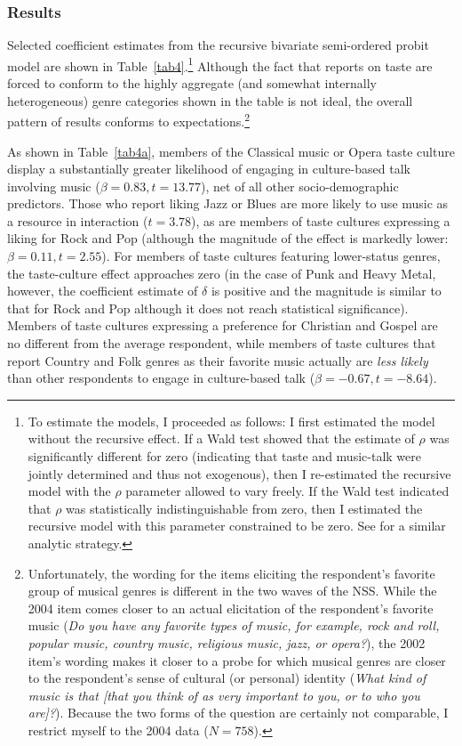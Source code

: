 \documentclass[11pt]{article}
\begin{document}
\subsubsection{Results}
Selected coefficient estimates from the recursive bivariate semi-ordered probit model are shown in Table~\ref{tab4}.\footnote{To estimate the models, I proceeded as follows:  I first estimated the model without the recursive effect.  If a Wald test showed that the estimate of $\rho$ was significantly different for zero (indicating that taste and music-talk were jointly determined and thus not exogenous), then I re-estimated the recursive model with the $\rho$ parameter allowed to vary freely.  If the Wald test indicated that $\rho$ was statistically indistinguishable from zero, then I estimated the recursive model with this parameter constrained to be zero. See \citet{greene98} for a similar analytic strategy.} Although the fact that reports on taste are forced to conform to the highly aggregate (and somewhat internally heterogeneous) genre categories shown in the table is not ideal, the overall pattern of results conforms to expectations.\footnote{Unfortunately, the wording for the items eliciting the respondent's favorite group of musical genres is different in the two waves of the NSS. While the 2004 item comes closer to an actual elicitation  of the respondent's favorite music (\emph{Do you have any favorite types of music, for example, rock and roll, popular music, country music, religious music, jazz, or opera?}), the 2002 item's wording makes it closer to a probe for which musical genres are closer to the respondent's sense of cultural (or personal) identity (\emph{What kind of music is that [that you think of as very important to you, or to who you are]?}).  Because the two forms of the question are certainly not  comparable, I restrict myself to the 2004 data ($N=758$).}  

As shown in Table~\ref{tab4a}, members of the Classical music or Opera taste culture display a substantially greater likelihood of engaging in culture-based talk involving music ($\beta=0.83, t=13.77$), net of all other socio-demographic predictors.  Those who report liking Jazz or Blues are more likely to use music as a resource in interaction  ($t=3.78$), as are members of taste cultures expressing a liking for Rock and Pop (although the magnitude of the effect is markedly lower: $\beta=0.11, t=2.55$).   For members of taste cultures featuring lower-status genres, the taste-culture effect approaches zero (in the case of Punk and Heavy Metal, however, the coefficient estimate of $\delta$ is positive and the magnitude is similar to that for Rock and Pop although it does not reach statistical significance).  Members of taste cultures expressing a preference for Christian and Gospel are no different from the average respondent, while members of taste cultures that report Country and Folk genres as their favorite music actually are \emph{less likely} than other respondents to engage in culture-based talk ($\beta=-0.67, t=-8.64$).   
\end{document}
